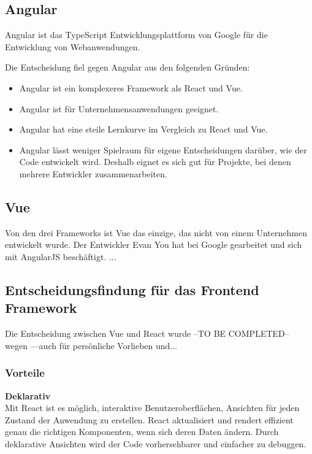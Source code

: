 \subsection{Angular}
Angular ist das TypeScript Entwicklungsplattform von Google für die Entwicklung von Webanwendungen.

Die Entscheidung fiel gegen Angular aus den folgenden Gründen:
\begin{itemize}
  \item
        Angular ist ein komplexeres Framework als React und Vue.
  \item
        Angular ist für Unternehmensanwendungen geeignet.
  \item
        Angular hat eine steile Lernkurve im Vergleich zu React und Vue.{\cite{E01}}
  \item
        Angular lässt weniger Spielraum für eigene Entscheidungen darüber, wie der Code entwickelt wird. Deshalb eignet es sich gut für Projekte, bei denen mehrere Entwickler zusammenarbeiten.
\end{itemize}

\subsection{Vue}
Von den drei Frameworks ist Vue das einzige, das nicht von einem Unternehmen entwickelt wurde. Der Entwickler Evan You hat bei Google gearbeitet und sich mit AngularJS beschäftigt.
...



{\cite{V02}}


\subsection{Entscheidungsfindung für das Frontend Framework}
Die Entscheidung zwischen Vue und React wurde --TO BE COMPLETED-- wegen ---auch für persönliche Vorlieben und...
\newline
\subsubsection{Vorteile}
\textbf{Deklarativ} \\
Mit React ist es möglich, interaktive Benutzeroberflächen, Ansichten für jeden Zustand der Anwendung zu erstellen. React aktualisiert und rendert effizient genau die richtigen Komponenten, wenn sich deren Daten ändern.
Durch deklarative Ansichten wird der Code vorhersehbarer und einfacher zu debuggen.
\newline

